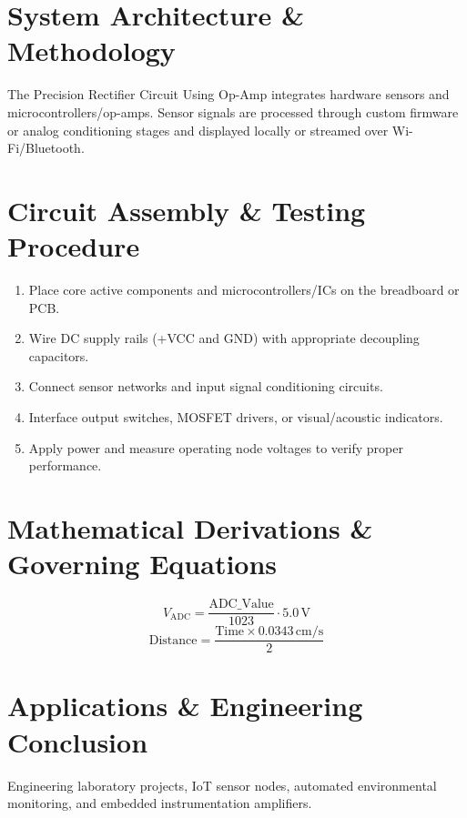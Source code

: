 \documentclass[11pt,a4paper]{article}
\begin{document}
\section{System Architecture \& Methodology}
The Precision Rectifier Circuit Using Op-Amp integrates hardware sensors and microcontrollers/op-amps. Sensor signals are processed through custom firmware or analog conditioning stages and displayed locally or streamed over Wi-Fi/Bluetooth.

\section{Circuit Assembly \& Testing Procedure}
\begin{enumerate}
    \item Place core active components and microcontrollers/ICs on the breadboard or PCB.
    \item Wire DC supply rails (+VCC and GND) with appropriate decoupling capacitors.
    \item Connect sensor networks and input signal conditioning circuits.
    \item Interface output switches, MOSFET drivers, or visual/acoustic indicators.
    \item Apply power and measure operating node voltages to verify proper performance.
\end{enumerate}

\section{Mathematical Derivations \& Governing Equations}
\begin{equation}
V_{\text{ADC}} = \frac{\text{ADC\_Value}}{1023} \cdot 5.0\,\text{V}
\end{equation}
\begin{equation}
\text{Distance} = \frac{\text{Time} \times 0.0343\,\text{cm/s}}{2}
\end{equation}

\section{Applications \& Engineering Conclusion}
Engineering laboratory projects, IoT sensor nodes, automated environmental monitoring, and embedded instrumentation amplifiers.
\end{document}

